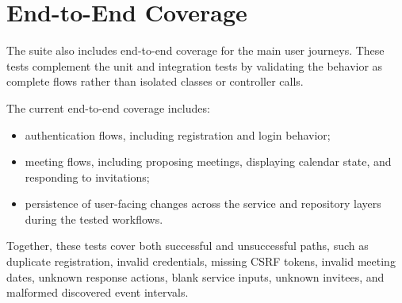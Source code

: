 \section{End-to-End Coverage}

The suite also includes end-to-end coverage for the main user journeys. These tests complement the unit and integration tests by validating the behavior as complete flows rather than isolated classes or controller calls.

The current end-to-end coverage includes:
\begin{itemize}
    \item authentication flows, including registration and login behavior;
    \item meeting flows, including proposing meetings, displaying calendar state, and responding to invitations;
    \item persistence of user-facing changes across the service and repository layers during the tested workflows.
\end{itemize}

Together, these tests cover both successful and unsuccessful paths, such as duplicate registration, invalid credentials, missing CSRF tokens, invalid meeting dates, unknown response actions, blank service inputs, unknown invitees, and malformed discovered event intervals.
